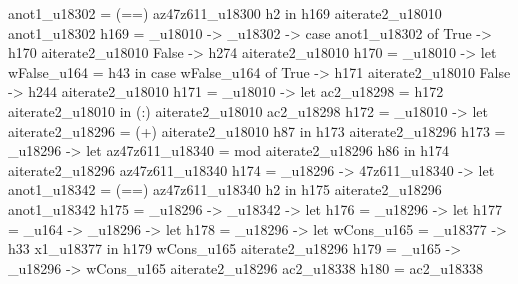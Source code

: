                                                            anot1_u18302 = (==) az47z611_u18300 h2
                                                         in h169 aiterate2_u18010 anot1_u18302
         h169 = _u18010 -> _u18302 -> case anot1_u18302 of
                                                        True -> h170 aiterate2_u18010
                                                        False -> h274 aiterate2_u18010
         h170 = _u18010 -> let wFalse_u164 = h43
                                     in case wFalse_u164 of
                                          True -> h171 aiterate2_u18010
                                          False -> h244 aiterate2_u18010
         h171 = _u18010 -> let ac2_u18298 = h172 aiterate2_u18010
                                     in (:) aiterate2_u18010 ac2_u18298
         h172 = _u18010 -> let
                                       aiterate2_u18296 = (+) aiterate2_u18010 h87
                                     in h173 aiterate2_u18296
         h173 = _u18296 -> let
                                       az47z611_u18340 = mod aiterate2_u18296 h86
                                     in h174 aiterate2_u18296 az47z611_u18340
         h174 = _u18296 -> \az47z611_u18340 -> let
                                                           anot1_u18342 = (==) az47z611_u18340 h2
                                                         in h175 aiterate2_u18296 anot1_u18342
         h175 = _u18296 -> _u18342 -> let
                                                        h176 = _u18296 -> let
                                                                                      h177 = \wFalse_u164 -> _u18296 -> let
                                                                                                                                    h178 = _u18296 -> let
                                                                                                                                                                  wCons_u165 = _u18377 -> h33 x1_u18377
                                                                                                                                                                in h179 wCons_u165 aiterate2_u18296
                                                                                                                                    h179 = \wCons_u165 -> _u18296 -> wCons_u165 aiterate2_u18296 ac2_u18338
                                                                                                                                    h180 = ac2_u18338
